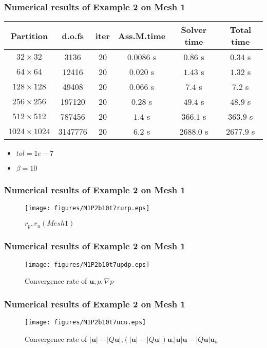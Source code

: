 \documentclass[notheorems,serif]{beamer}
\begin{document}
\begin{frame}
\frametitle{Numerical results of Example 2 on Mesh 1}
\begin{tabular}{ |c|c|c|c|c|c| }   
\hline   
Partition & d.o.fs & iter & Ass.M.time & Solver time & Total time \\
\hline
$32\times 32$ & 3136 & 20 & $0.0086$ s & $0.86$ s & $0.34$ s \\
$64\times 64$ & 12416 & 20 & $0.020$ s & $1.43$ s & $1.32$ s \\
$128\times 128$ & 49408 & 20 & $0.066$ s & $7.4$ s & $7.2$ s \\
$256\times 256$ & 197120 & 20 & $0.28$ s & $49.4$ s & $48.9$ s \\
$512\times 512$ & 787456 & 20 & $1.4$ s & $366.1$ s & $363.9$ s \\
$1024\times 1024$ & 3147776 & 20 & $6.2$ s & $2688.0$ s & $2677.9$ s \\
\hline 
\end{tabular}
\smallskip
\begin{itemize}
\item $tol = 1e-7$
\item $\beta = 10$
\end{itemize}
\end{frame}

\begin{frame}
\frametitle{Numerical results of Example 2 on Mesh 1}
\begin{figure}[H] 
\centering 
\texttt{[image: figures/M1P2b10t7rurp.eps]} 
\caption{$r_p, r_u(Mesh 1)$}
\label{fig:rpmesh1p2}
\end{figure}
\end{frame}

\begin{frame}
\frametitle{Numerical results of Example 2 on Mesh 1}
\begin{figure}[H] 
\centering 
\texttt{[image: figures/M1P2b10t7updp.eps]} 
\caption{Convergence rate of $\boldsymbol{u}, p, \nabla p$}
\label{fig:upmesh1p2} 
\end{figure}
\end{frame}

\begin{frame}
\frametitle{Numerical results of Example 2 on Mesh 1}
\begin{figure}[H] 
\centering 
\texttt{[image: figures/M1P2b10t7ucu.eps]} 
\caption{Convergence rate of $\left|\boldsymbol{u}\right|-\left|Q\boldsymbol{u}\right|$,$(\left|\boldsymbol{u}\right|-\left|Q\boldsymbol{u}\right|)\boldsymbol{u}$,$\left|\boldsymbol{u}\right|\boldsymbol{u}-\left|Q\boldsymbol{u}\right|\boldsymbol{u}_h$}
\label{fig:normumesh1p2} 
\end{figure}
\end{frame}
\end{document}
